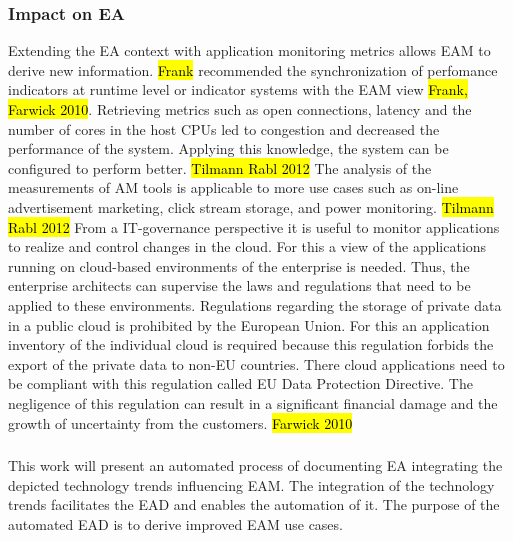 \subsubsection{Impact on EA}
Extending the EA context with application monitoring metrics allows EAM to derive new information. \hl{Frank} recommended the synchronization of perfomance indicators at runtime level or indicator systems with the EAM view \hl{Frank, Farwick 2010}. Retrieving metrics such as open connections, latency and the number of cores in the host CPUs led to congestion and decreased the performance of the system. Applying this knowledge, the system can be configured to perform better. \hl{Tilmann Rabl 2012} The analysis of the measurements of AM tools is applicable to more use cases such as  on-line advertisement marketing, click stream storage, and power monitoring. \hl{Tilmann Rabl 2012}
From a IT-governance perspective it is useful to monitor applications to realize and control changes in the cloud. For this a view of the applications running on cloud-based environments of the enterprise is needed. Thus, the enterprise architects can supervise the laws and regulations that need to be applied to these environments. 
Regulations regarding the storage of private data in a public cloud is prohibited by the European Union. For this an application inventory of the individual cloud is required because this regulation forbids the export of the private data to non-EU countries. There cloud applications need to be compliant with this regulation called EU Data Protection Directive. The negligence of this regulation can result in a significant financial damage and the growth of uncertainty from the customers. \hl{Farwick 2010}

\subsubsection{}
This work will present an automated process of documenting EA integrating the depicted technology trends influencing EAM. The integration of the technology trends facilitates the EAD and enables the automation of it. The purpose of the automated EAD is to derive improved EAM use cases.


